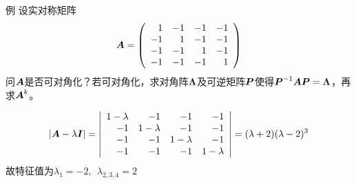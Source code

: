         \begin{frame}
          
          \begin{li}{例}
            设实对称矩阵
            $$
            \boldsymbol{A}=\left(
              \begin{array}{rrrr}
                1&-1&-1&-1\\
                -1&1&-1&-1\\
                -1&-1&1&-1\\
                -1&-1&-1&1
              \end{array}
            \right)
            $$
            问$\boldsymbol{A}$是否可对角化？若可对角化，求对角阵$\boldsymbol{\Lambda}$及可逆矩阵$\boldsymbol{P}$使得$\boldsymbol{P}^{-1}\boldsymbol{A}\boldsymbol{P}=\boldsymbol{\Lambda}$，再求$\boldsymbol{A}^k$。
          \end{li}
          \pause\proofname
          $$
          |\boldsymbol{A}-\lambda\boldsymbol{I}|=\left|
            \begin{array}{rrrr}
              1-\lambda&-1&-1&-1\\
              -1&1-\lambda&-1&-1\\
              -1&-1&1-\lambda&-1\\
              -1&-1&-1&1-\lambda
            \end{array}
          \right|=(\lambda+2)(\lambda-2)^3
          $$
          故特征值为$\lambda_1=-2,~~\lambda_{2,3,4}=2$
          
        \end{frame}

